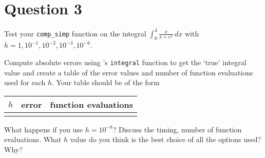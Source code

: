 \section{Question 3}

\begin{question}
    Test your \verb+comp_simp+ \MATLAB function on the integral $\int_{0}^{4}{\tfrac{x}{x+e^x}}\,dx$ with $h = 1,10^{-1},10^{-2},10^{−3},10^{−6}$. 
    
    Compute absolute errors using \MATLAB’s \verb+integral+ function to get the ‘true’ integral value and create a table of the error values and number of function evaluations used for each $h$. Your table should be of the form
    \begin{tabular}
        {c|c|c}
        $h$ & error & function evaluations \\\hline
        & 
    \end{tabular}
    
    What happens if you use $h = 10^{−8}$? Discuss the timing, number of function evaluations. What $h$ value do you think is the best choice of all the options used? Why?
\end{question}


